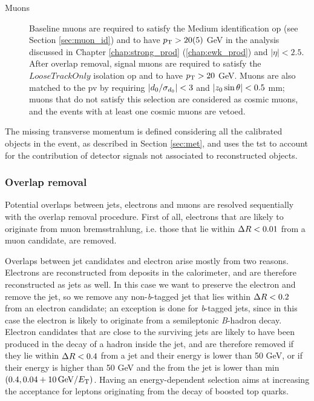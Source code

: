 \begin{description}
\item[Muons] Baseline muons are required to satisfy the Medium identification \gls{op} (see Section \ref{sec:muon_id}) and to have $p_{\rm T} > 20 (5)$ GeV in the analysis discussed in Chapter \ref{chap:strong_prod} (\ref{chap:ewk_prod}) and $|\eta|<2.5$. 
After overlap removal, signal muons are required to satisfy the $LooseTrackOnly$ isolation \gls{op} and to have $p_{\rm T} > 20$ GeV.
Muons are also matched to the \gls{pv} by requiring $|{d_0}/\sigma_{d_0}| < 3$ and  $|{z_0} \sin\theta| < 0.5$ mm; muons that do not satisfy this selection are considered as cosmic muons, and the events with at least one cosmic muons are vetoed.

\end{description}

The missing transverse momentum is defined considering all the calibrated objects in the event, as described in Section \ref{sec:met}, and uses the \gls{tst} to account for the contribution of
detector signals not associated to reconstructed objects. 

\subsubsection*{Overlap removal}

Potential overlaps between jets, electrons and muons are resolved sequentially with the overlap removal procedure. 
First of all, electrons that are likely to originate from muon bremsstrahlung, i.e. those that lie within $\Delta R < 0.01$ from a muon candidate, are removed.

Overlaps between jet candidates and electron arise mostly from two reasons. Electrons are reconstructed from deposits in the calorimeter, and are therefore reconstructed as jets as well.
In this case we want to preserve the electron and remove the jet, so we remove any non-\textit{b}-tagged jet that lies within $\Delta R < 0.2$ from an electron candidate;
an exception is done for \textit{b}-tagged jets, since in this case the electron is likely to originate from a semileptonic \textit{B}-hadron decay. 
Electron candidates that are close to the surviving jets are likely to have been produced in the decay of a hadron inside the jet, and are therefore removed
if they lie within $\Delta R<0.4$ from a jet and their energy is lower than 50 GeV, or if their energy is higher than 50 GeV and the \dR from the jet 
is lower than min$(0.4, 0.04 + 10 \, {\rm{GeV}}/E_{\rm{T}})$. 
Having an energy-dependent \dR selection aims at increasing the acceptance for leptons originating from the decay of boosted top quarks.

